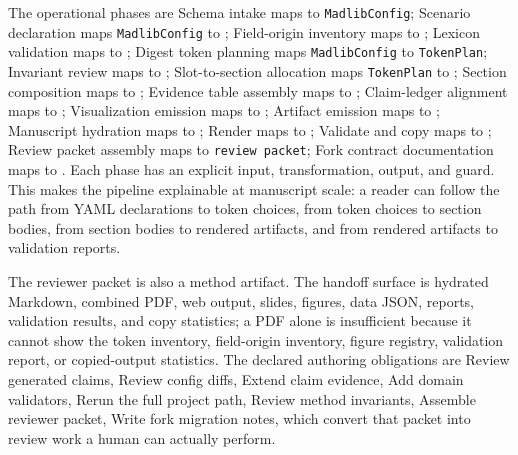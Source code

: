 \documentclass[
  english,
]{article}
\begin{document}
The operational phases are Schema intake maps
 to \texttt{MadlibConfig}; Scenario
declaration maps \texttt{MadlibConfig} to ;
Field-origin inventory maps 
to ; Lexicon validation maps
 to
; Digest token planning maps
\texttt{MadlibConfig} to \texttt{TokenPlan}; Invariant review maps
 to
; Slot-to-section allocation maps
\texttt{TokenPlan} to ; Section
composition maps  to
; Evidence table assembly maps
 to
; Claim-ledger alignment maps
to ; Visualization emission
maps
 to
; Artifact emission
maps  to
; Manuscript
hydration maps
 to
; Render maps
 to
; Validate and copy
maps  to
; Review packet assembly maps
 to
\texttt{review\ packet}; Fork contract documentation maps
 to
. Each phase has an explicit input,
transformation, output, and guard. This makes the pipeline explainable
at manuscript scale: a reader can follow the path from YAML declarations
to token choices, from token choices to section bodies, from section
bodies to rendered artifacts, and from rendered artifacts to validation
reports.

The reviewer packet is also a method artifact. The handoff surface is
hydrated Markdown, combined PDF, web output, slides, figures, data JSON,
reports, validation results, and copy statistics; a PDF alone is
insufficient because it cannot show the token inventory, field-origin
inventory, figure registry, validation report, or copied-output
statistics. The declared authoring obligations are Review generated
claims, Review config diffs, Extend claim evidence, Add domain
validators, Rerun the full project path, Review method invariants,
Assemble reviewer packet, Write fork migration notes, which convert that
packet into review work a human can actually perform.
\end{document}
